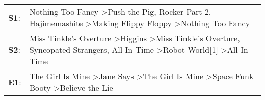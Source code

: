 \begin{supertabular}{p{0.03\textwidth}p{0.92\textwidth}}
 \textbf{S1}:  &                                                          Nothing Too Fancy\textsuperscript{} \textgreater \enspace Push the Pig\textsuperscript{}, \enspace Rocker Part 2\textsuperscript{}, \enspace Hajimemashite\textsuperscript{} \textgreater \enspace Making Flippy Floppy\textsuperscript{} \textgreater \enspace Nothing Too Fancy\textsuperscript{}  \enspace  \\
 \textbf{S2}:  &  Miss Tinkle's Overture\textsuperscript{} \textgreater \enspace Higgins\textsuperscript{} \textgreater \enspace Miss Tinkle's Overture\textsuperscript{}, \enspace Syncopated Strangers\textsuperscript{}, \enspace All In Time\textsuperscript{} \textgreater \enspace Robot World[1]\textsuperscript{} \textgreater \enspace All In Time\textsuperscript{}  \enspace  \\
 \textbf{E1}:  &                                                                                               The Girl Is Mine\textsuperscript{} \textgreater \enspace Jane Says\textsuperscript{} \textgreater \enspace The Girl Is Mine\textsuperscript{} \textgreater \enspace Space Funk Booty\textsuperscript{} \textgreater \enspace Believe the Lie\textsuperscript{}  \enspace  \\
\end{supertabular}
